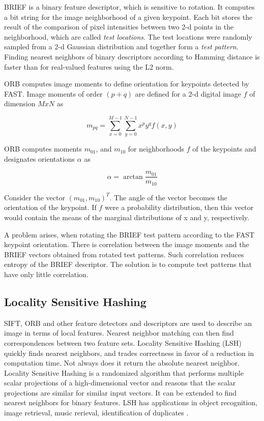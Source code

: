 BRIEF is a binary feature descriptor, which is sensitive to rotation. It
computes a bit string for the image neighborhood of a given keypoint. Each bit
stores the result of the comparison of pixel intensities between two 2-d points
in the neighborhood, which are called {\it test locations}. The test locations
were randomly sampled from a 2-d Gaussian distribution and together form a {\it
test pattern}. Finding nearest neighbors of binary descriptors according to
Hamming distance is faster than for real-valued features using the L2 norm.


ORB computes image moments to define orientation for keypoints detected by
FAST. Image moments of order $(p + q)$ are defined for a 2-d digital image $f$
of dimension $MxN$ as

\begin{equation}
    m_{pq} = \sum_{x=0}^{M-1} \sum_{y=0}^{N-1} x^p y^q f(x, y)
\end{equation}

ORB computes moments $m_{01}$, and $m_{10}$ for neighborhoods $f$ of the
keypoints and designates orientations $\alpha$ as

\begin{equation}
    \alpha = \arctan \frac{m_{01}}{m_{10}}
\end{equation}

Consider the vector $\left( m_{01}, m_{10}\right)^T$. The angle of the vector
becomes the orientation of the keypoint. If $f$ were a probability
distribution, then this vector would contain the means of the marginal
distributions of x and y, respectively.

A problem arises, when rotating the BRIEF test pattern according to the FAST
keypoint orientation. There is correlation between the image moments and the
BRIEF vectors obtained from rotated test patterns. Such correlation reduces
entropy of the BRIEF descriptor. The solution is to compute test patterns that
have only little correlation.

\subsection{Locality Sensitive Hashing}


SIFT, ORB and other feature detectors and descriptors are used to describe an
image in terms of local features. Nearest neighbor matching can then find
correspondences between two feature sets. Locality Sensitive Hashing (LSH)
quickly finds nearest neighbors, and trades correctness in favor of a reduction
in computation time. Not always does it return the absolute nearest neighbor.
Locality Sensitive Hashing is a randomized algorithm that performs multiple
scalar projections of a high-dimensional vector and reasons that the scalar
projections are similar for similar input vectors. It can be extended to find
nearest neighbors for binary features. LSH has applications in object
recognition, image retrieval, music rerieval, identification of duplicates
\cite{Slaney2008}.

